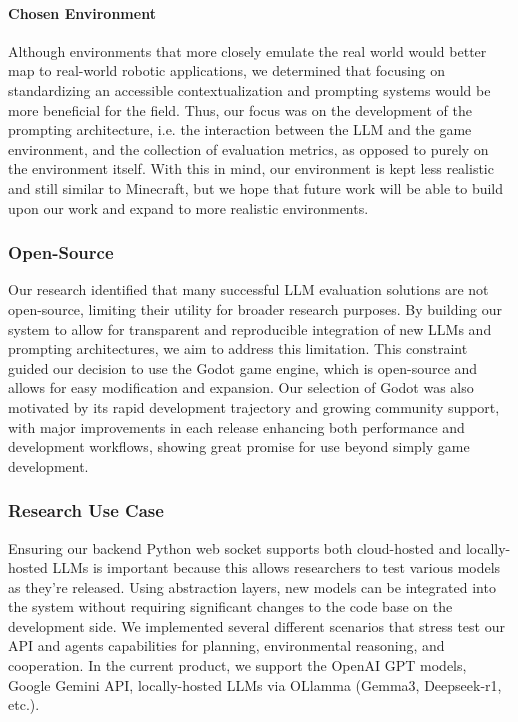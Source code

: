 \documentclass{article}
\begin{document}
\paragraph{Chosen Environment} Although environments that more closely emulate the real world would better map to real-world robotic applications, we determined that focusing on standardizing an accessible contextualization and prompting systems would be more beneficial for the field.
Thus, our focus was on the development of the prompting architecture, i.e. the interaction between the LLM and the game environment, and the collection of evaluation metrics, as opposed to purely on the environment itself.
With this in mind, our environment is kept less realistic and still similar to Minecraft, but we hope that future work will be able to build upon our work and expand to more realistic environments.

\subsubsection{Open-Source}
Our research identified that many successful LLM evaluation solutions are not open-source, limiting their utility for broader research purposes.
By building our system to allow for transparent and reproducible integration of new LLMs and prompting architectures, we aim to address this limitation.
This constraint guided our decision to use the Godot game engine, which is open-source and allows for easy modification and expansion.
Our selection of Godot was also motivated by its rapid development trajectory and growing community support, with major improvements in each release enhancing both performance and development workflows, showing great promise for use beyond simply game development.

\subsubsection{Research Use Case}
Ensuring our backend Python web socket supports both cloud-hosted and locally-hosted LLMs is important because this allows researchers to test various models as they're released.
Using abstraction layers, new models can be integrated into the system without requiring significant changes to the code base on the development side.
We implemented several different scenarios that stress test our API and agents capabilities for planning, environmental reasoning, and cooperation.
In the current product, we support the OpenAI GPT models, Google Gemini API, locally-hosted LLMs via OLlamma (Gemma3, Deepseek-r1, etc.).
\end{document}
